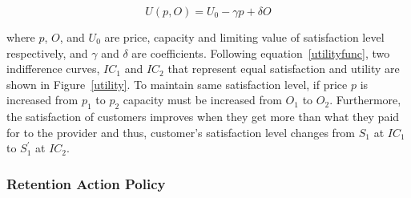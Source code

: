 \begin{equation}
U(p,O)=U_0-\gamma p+\delta O
\label{utilityfunc}
\end{equation}
 
where $p$, $O$, and $U_0$ are price, capacity and limiting value of satisfaction level respectively, and $\gamma$ and $\delta$ are coefficients. Following  equation~\ref{utilityfunc}, two indifference curves, $IC_{1}$ and $IC_{2}$ that represent equal satisfaction and utility are shown in Figure~\ref{utility}. To maintain same satisfaction level, if price $p$ is increased from $p_1$ to $p_{2}$ capacity must be increased from $O_1$ to $O_{2}$. Furthermore, the satisfaction of customers improves when they get more than what they paid for to the provider and thus, customer's satisfaction level changes from $S_1$ at $IC_{1}$ to $S_{1}^{'}$ at $IC_{2}$. 



%



\subsubsection{Retention Action Policy}
%



